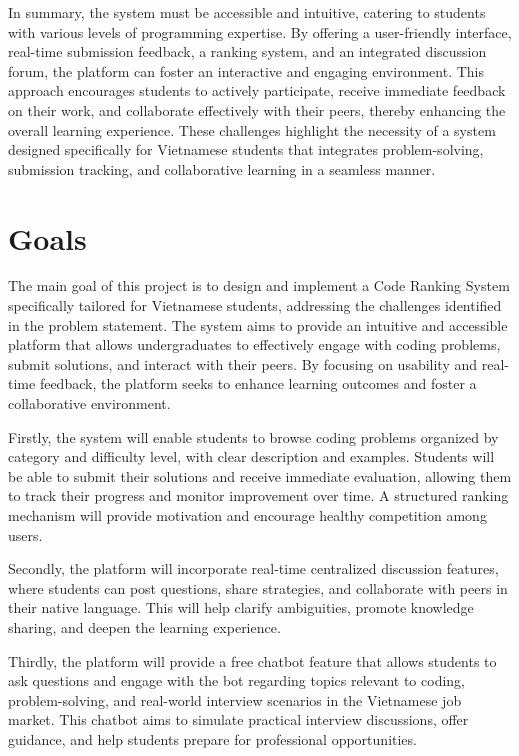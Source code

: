 In summary, the system must be accessible and intuitive, catering to students with various levels of programming expertise. By offering a user-friendly interface, real-time submission feedback, a ranking system, and an integrated discussion forum, the platform can foster an interactive and engaging environment. This approach encourages students to actively participate, receive immediate feedback on their work, and collaborate effectively with their peers, thereby enhancing the overall learning experience. These challenges highlight the necessity of a system designed specifically for Vietnamese students that integrates problem-solving, submission tracking, and collaborative learning in a seamless manner.

\section{Goals}

The main goal of this project is to design and implement a Code Ranking System specifically tailored for Vietnamese students, addressing the challenges identified in the problem statement. The system aims to provide an intuitive and accessible platform that allows undergraduates to effectively engage with coding problems, submit solutions, and interact with their peers. By focusing on usability and real-time feedback, the platform seeks to enhance learning outcomes and foster a collaborative environment.

Firstly, the system will enable students to browse coding problems organized by category and difficulty level, with clear description and examples. Students will be able to submit their solutions and receive immediate evaluation, allowing them to track their progress and monitor improvement over time. A structured ranking mechanism will provide motivation and encourage healthy competition among users.

Secondly, the platform will incorporate real-time centralized discussion features,  where students can post questions, share strategies, and collaborate with peers in their native language. This will help clarify ambiguities, promote knowledge sharing, and deepen the learning experience.

Thirdly, the platform will provide a free chatbot feature that allows students to ask questions and engage with the bot regarding topics relevant to coding, problem-solving, and real-world interview scenarios in the Vietnamese job market. This chatbot aims to simulate practical interview discussions, offer guidance, and help students prepare for professional opportunities.

